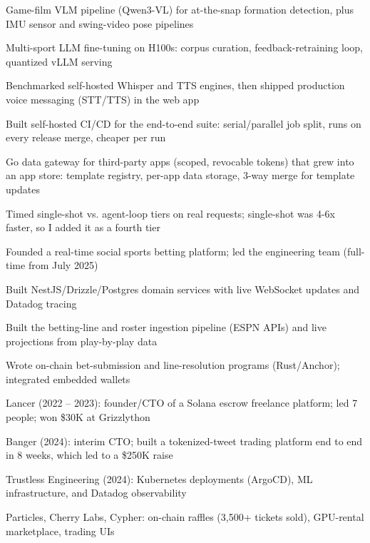 \documentclass[print]{jack-resume}
\begin{document}
\begin{tightemize}
    \item Game-film VLM pipeline (Qwen3-VL) for at-the-snap formation detection, plus IMU sensor and swing-video pose pipelines
    \item Multi-sport LLM fine-tuning on H100s: corpus curation, feedback-retraining loop, quantized vLLM serving
    \item Benchmarked self-hosted Whisper and TTS engines, then shipped production voice messaging (STT/TTS) in the web app
    \item Built self-hosted CI/CD for the end-to-end suite: serial/parallel job split, runs on every release merge, cheaper per run
    \item Go data gateway for third-party apps (scoped, revocable tokens) that grew into an app store: template registry, per-app data storage, 3-way merge for template updates
    \item Timed single-shot vs. agent-loop tiers on real requests; single-shot was 4-6x faster, so I added it as a fourth tier
\end{tightemize}
\sectionsep

\begin{tightemize}
    \item Founded a real-time social sports betting platform; led the engineering team (full-time from July 2025)
    \item Built NestJS/Drizzle/Postgres domain services with live WebSocket updates and Datadog tracing
    \item Built the betting-line and roster ingestion pipeline (ESPN APIs) and live projections from play-by-play data
    \item Wrote on-chain bet-submission and line-resolution programs (Rust/Anchor); integrated embedded wallets
\end{tightemize}
\sectionsep

\begin{tightemize}
    \item Lancer (2022 – 2023): founder/CTO of a Solana escrow freelance platform; led 7 people; won \$30K at Grizzlython
    \item Banger (2024): interim CTO; built a tokenized-tweet trading platform end to end in 8 weeks, which led to a \$250K raise
    \item Trustless Engineering (2024): Kubernetes deployments (ArgoCD), ML infrastructure, and Datadog observability
    \item Particles, Cherry Labs, Cypher: on-chain raffles (3,500+ tickets sold), GPU-rental marketplace, trading UIs
\end{tightemize}
\sectionsep
\end{document}
